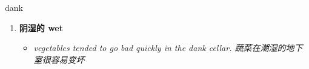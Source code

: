 
\begin{frame}
{\huge dank}
\begin{center}
\begin{enumerate}\Large
  \item \textbf{阴湿的 wet}
  \begin{itemize}
    \item \em{\Large{vegetables tended to go bad quickly in the dank cellar. 蔬菜在潮湿的地下室很容易变坏}}
  \end{itemize}
\end{enumerate}
\end{center}
\end{frame}
